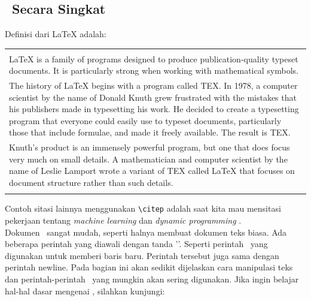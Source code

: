 \chapter{\babDua}

\section{\latex~Secara Singkat}
Definisi dari LaTeX \citep{lankton2008introduction} adalah: \\ 
\begin{tabular}{| p{13cm} |}
	\hline 
	\\
	LaTeX is a family of programs designed to produce publication-quality 
	typeset documents. It is particularly strong when working with 
	mathematical symbols. \\	
	The history of LaTeX begins with a program called TEX. In 1978, a 
	computer scientist by the name of Donald Knuth grew frustrated with the 
	mistakes that his publishers made in typesetting his work. He decided 
	to create a typesetting program that everyone could easily use to 
	typeset documents, particularly those that include formulae, and made 
	it freely available. The result is TEX. \\	
	Knuth's product is an immensely powerful program, but one that does 
	focus very much on small details. A mathematician and computer 
	scientist by the name of Leslie Lamport wrote a variant of TEX called 
	LaTeX that focuses on document structure rather than such details. \\
	\\
	\hline
\end{tabular}

\vspace*{0.8cm}

Contoh sitasi lainnya menggunakan \verb|\citep| adalah saat kita mau mensitasi pekerjaan tentang \textit{machine learning} \citep{chin2000learning} dan \textit{dynamic programming} \citep{barto1995learning}. \\

Dokumen \latex~sangat mudah, seperti halnya membuat dokumen teks biasa. Ada 
beberapa perintah yang diawali dengan tanda '\bslash'. 
Seperti perintah \bslash\bslash~yang digunakan untuk memberi baris baru. 
Perintah tersebut juga sama dengan perintah \bslash newline. 
Pada bagian ini akan sedikit dijelaskan cara manipulasi teks dan 
perintah-perintah \latex~yang mungkin akan sering digunakan. 
Jika ingin belajar hal-hal dasar mengenai \latex, silahkan kunjungi: 

